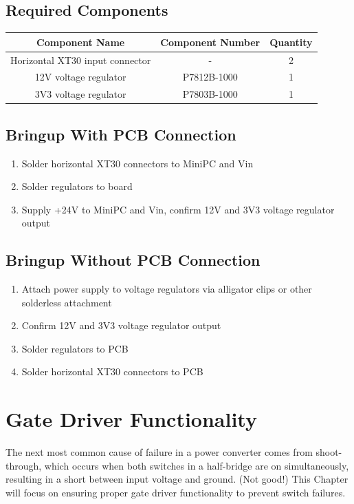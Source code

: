 \documentclass[]{report}
\begin{document}
\section{Required Components}
\begin{tabular}{|c|c|c|}
	\hline
	\textbf{Component Name} & \textbf{Component Number} & \textbf{Quantity} \\
	\hline
	Horizontal XT30 input connector& - & 2 \\
	\hline
	12V voltage regulator & P7812B-1000 & 1 \\
	\hline
	3V3 voltage regulator & P7803B-1000  & 1 \\
	\hline
\end{tabular}
\section {Bringup With PCB Connection} \label{voltagewithpcb}
\begin{enumerate}
	\item Solder horizontal XT30 connectors to MiniPC and Vin
	\item Solder regulators to board
	\item Supply +24V to MiniPC and Vin, confirm 12V and 3V3 voltage regulator output
\end{enumerate}
\section{Bringup Without PCB Connection}\label{voltagenopcb}
\begin{enumerate}
	\item Attach power supply to voltage regulators via alligator clips or other solderless attachment
	\item Confirm 12V and 3V3 voltage regulator output
	\item Solder regulators to PCB
	\item Solder horizontal XT30 connectors to PCB
\end{enumerate}
\chapter{Gate Driver Functionality} \label{drivers}
The next most common cause of failure in a power converter comes from shoot-through, which occurs when both switches in a half-bridge are on simultaneously, resulting in a short between input voltage and ground. (Not good!) This Chapter will focus on ensuring proper gate driver functionality to prevent switch failures. 
\end{document}
